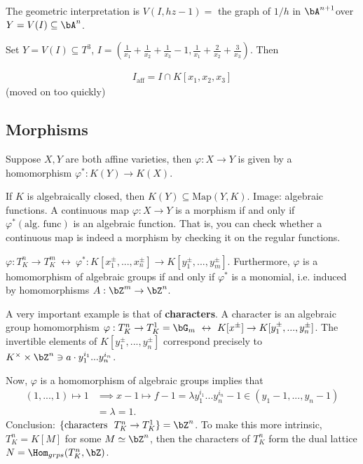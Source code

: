 The geometric interpretation is $V(I,hz - 1) = $ the graph of $1/h$ in $\bA^{n+1}$over $Y = V(I) \subseteq \bA^n$.

\begin{example}
  Set $Y = V(I) \subseteq T^3$, $I = \left(\frac{1}{x_1} + \frac{1}{x_2} + \frac{1}{x_3} - 1, \frac{1}{x_1}+\frac{2}{x_2}+\frac{3}{x_3}\right)$. Then

  \begin{align*}
    I_{\text{aff}} = I \cap K[x_1,x_2,x_3]
  \end{align*}
  (moved on too quickly)
\end{example}

\bigskip

\subsection{Morphisms}
Suppose $X,Y$ are both affine varieties, then $\varphi:X\to Y$ is given by a homomorphism $\varphi^*:K(Y) \to K(X)$.

If $K$ is algebraically closed, then $K(Y) \subseteq \text{Map}(Y,K)$. Image: algebraic functions. A continuous map $\varphi:X\to Y$ is a morphism if and only if $\varphi^*(\text{alg. func})$ is an algebraic function. That is, you can check whether a continuous map is indeed a morphism by checking it on the regular functions.

\begin{example}
  $\varphi:T^n_K \to T^m_K ~\leftrightarrow~ \varphi^*:K[x^{\pm}_1,...,x^{\pm}_n] \to K[y^{\pm}_1,...,y^{\pm}_m]$. Furthermore, $\varphi$ is a homomorphism of algebraic groups if and only if $\varphi^*$ is a monomial, i.e. induced by homomorphisms $A:\bZ^m \to \bZ^n$.

  A very important example is that of \textbf{characters}. A character is an algebraic group homomorphism $\varphi:T^n_K \to T^1_K = \bG_m ~\leftrightarrow ~ K[x^{\pm}] \to K[y^{\pm}_1,...,y_n^{\pm}]$. The invertible elements of $K[y^{\pm}_1,...,y^{\pm}_n]$ correspond precisely to $K^\times \times \bZ^n \ni a\cdot y_1^{i_1}...y_n^{i_n}$.

  Now, $\varphi$ is a homomorphism of algebraic groups implies that
  \begin{align*}
    (1,...,1) \mapsto 1 &\implies x - 1 \mapsto f- 1 = \lambda y_1^{i_1}...y_n^{i_n} - 1 \in (y_1 - 1,...,y_n-1) \\
                        &= \lambda = 1.
  \end{align*}
Conclusion: $\{\text{characters }~ T^n_K\to T^1_K\} = \bZ^n$. To make this more intrinsic, $T^n_K = K[M]$ for some $M\simeq \bZ^n$, then the characters of $T^n_K$ form the dual lattice $N = \Hom_{grps}(T^n_K,\bZ)$.
\end{example}

